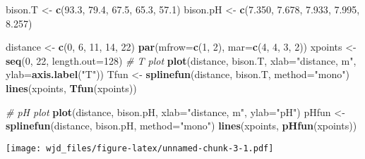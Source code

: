 \documentclass[]{article}
\newenvironment{Shaded}{\begin{snugshade}}{\end{snugshade}}
\newcommand{\KeywordTok}[1]{\textcolor[rgb]{0.13,0.29,0.53}{\textbf{#1}}}
\newcommand{\DataTypeTok}[1]{\textcolor[rgb]{0.13,0.29,0.53}{#1}}
\newcommand{\DecValTok}[1]{\textcolor[rgb]{0.00,0.00,0.81}{#1}}
\newcommand{\FloatTok}[1]{\textcolor[rgb]{0.00,0.00,0.81}{#1}}
\newcommand{\StringTok}[1]{\textcolor[rgb]{0.31,0.60,0.02}{#1}}
\newcommand{\CommentTok}[1]{\textcolor[rgb]{0.56,0.35,0.01}{\textit{#1}}}
\newcommand{\NormalTok}[1]{#1}
\begin{document}
\begin{Shaded}
\begin{Highlighting}[]
\NormalTok{bison.T <-}\StringTok{ }\KeywordTok{c}\NormalTok{(}\FloatTok{93.3}\NormalTok{, }\FloatTok{79.4}\NormalTok{, }\FloatTok{67.5}\NormalTok{, }\FloatTok{65.3}\NormalTok{, }\FloatTok{57.1}\NormalTok{)}
\NormalTok{bison.pH <-}\StringTok{ }\KeywordTok{c}\NormalTok{(}\FloatTok{7.350}\NormalTok{, }\FloatTok{7.678}\NormalTok{, }\FloatTok{7.933}\NormalTok{, }\FloatTok{7.995}\NormalTok{, }\FloatTok{8.257}\NormalTok{)}
\end{Highlighting}
\end{Shaded}

\begin{Shaded}
\begin{Highlighting}[]
\NormalTok{distance <-}\StringTok{ }\KeywordTok{c}\NormalTok{(}\DecValTok{0}\NormalTok{, }\DecValTok{6}\NormalTok{, }\DecValTok{11}\NormalTok{, }\DecValTok{14}\NormalTok{, }\DecValTok{22}\NormalTok{)}
\KeywordTok{par}\NormalTok{(}\DataTypeTok{mfrow=}\KeywordTok{c}\NormalTok{(}\DecValTok{1}\NormalTok{, }\DecValTok{2}\NormalTok{), }\DataTypeTok{mar=}\KeywordTok{c}\NormalTok{(}\DecValTok{4}\NormalTok{, }\DecValTok{4}\NormalTok{, }\DecValTok{3}\NormalTok{, }\DecValTok{2}\NormalTok{))}
\NormalTok{xpoints <-}\StringTok{ }\KeywordTok{seq}\NormalTok{(}\DecValTok{0}\NormalTok{, }\DecValTok{22}\NormalTok{, }\DataTypeTok{length.out=}\DecValTok{128}\NormalTok{)}
\CommentTok{# T plot}
\KeywordTok{plot}\NormalTok{(distance, bison.T, }\DataTypeTok{xlab=}\StringTok{"distance, m"}\NormalTok{, }\DataTypeTok{ylab=}\KeywordTok{axis.label}\NormalTok{(}\StringTok{"T"}\NormalTok{))}
\NormalTok{Tfun <-}\StringTok{ }\KeywordTok{splinefun}\NormalTok{(distance, bison.T, }\DataTypeTok{method=}\StringTok{"mono"}\NormalTok{)}
\KeywordTok{lines}\NormalTok{(xpoints, }\KeywordTok{Tfun}\NormalTok{(xpoints))}

\CommentTok{# pH plot}
\KeywordTok{plot}\NormalTok{(distance, bison.pH, }\DataTypeTok{xlab=}\StringTok{"distance, m"}\NormalTok{, }\DataTypeTok{ylab=}\StringTok{"pH"}\NormalTok{)}
\NormalTok{pHfun <-}\StringTok{ }\KeywordTok{splinefun}\NormalTok{(distance, bison.pH, }\DataTypeTok{method=}\StringTok{"mono"}\NormalTok{)}
\KeywordTok{lines}\NormalTok{(xpoints, }\KeywordTok{pHfun}\NormalTok{(xpoints))}
\end{Highlighting}
\end{Shaded}

\texttt{[image: wjd\_files/figure-latex/unnamed-chunk-3-1.pdf]}
\end{document}
